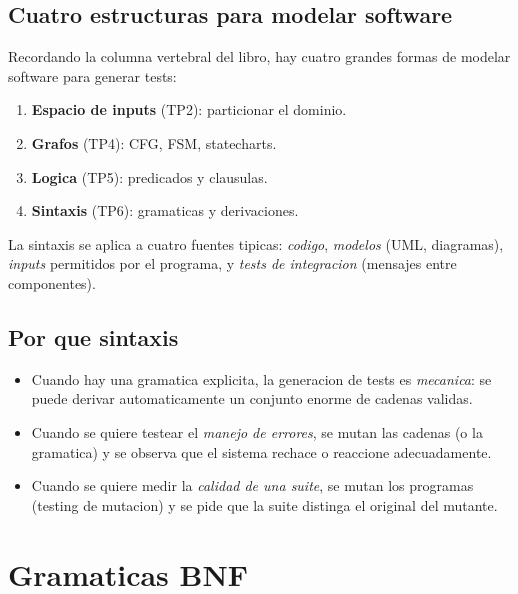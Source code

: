 \documentclass[12pt,a4paper]{article}
\begin{document}
\subsection{Cuatro estructuras para modelar software}

Recordando la columna vertebral del libro, hay cuatro grandes formas de modelar software para
generar tests:

\begin{enumerate}
  \item \textbf{Espacio de inputs} (TP2): particionar el dominio.
  \item \textbf{Grafos} (TP4): CFG, FSM, statecharts.
  \item \textbf{Logica} (TP5): predicados y clausulas.
  \item \textbf{Sintaxis} (TP6): gramaticas y derivaciones.
\end{enumerate}

\begin{ideabox}
La sintaxis se aplica a cuatro fuentes tipicas: \emph{codigo}, \emph{modelos} (UML, diagramas),
\emph{inputs} permitidos por el programa, y \emph{tests de integracion} (mensajes entre
componentes).
\end{ideabox}

\subsection{Por que sintaxis}

\begin{itemize}
  \item Cuando hay una gramatica explicita, la generacion de tests es \emph{mecanica}: se puede
  derivar automaticamente un conjunto enorme de cadenas validas.
  \item Cuando se quiere testear el \emph{manejo de errores}, se mutan las cadenas (o la
  gramatica) y se observa que el sistema rechace o reaccione adecuadamente.
  \item Cuando se quiere medir la \emph{calidad de una suite}, se mutan los programas (testing
  de mutacion) y se pide que la suite distinga el original del mutante.
\end{itemize}

\section{Gramaticas BNF}
\end{document}
